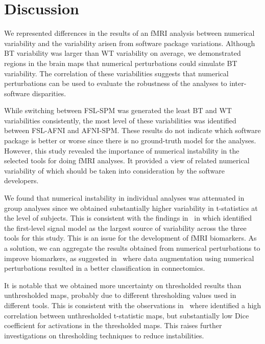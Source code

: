   \section{Discussion}

  We represented differences in the results of an fMRI analysis between numerical variability
  and the variability arisen from software package variations.
  Although BT variability was larger than WT variability on average,
  we demonstrated regions in the brain maps that numerical perturbations could simulate BT variability.
  The correlation of these variabilities suggests that numerical perturbations can be used to evaluate the robustness of the analyses
  to inter-software disparities.
  
  While switching between FSL-SPM was generated the least BT and WT variabilities consistently, the most level of these variabilities was identified
  between FSL-AFNI and AFNI-SPM. %
  These results do not indicate which software package is better or worse since there is no ground-truth model for the analyses.
  However, this study revealed the importance of numerical instability in the selected tools for doing fMRI analyses.
  It provided a view of related numerical variability of which should be taken into consideration by the software developers.
  
  We found that numerical instability in individual analyses was attenuated in group analyses
  since we obtained substantially higher variability in t-statistics at the level of subjects.
  This is consistent with the findings in~\cite{bowring2021isolating} in which identified the first-level signal model as the largest
  source of variability across the three tools for this study.
  This is an issue for the development of fMRI biomarkers.
  As a solution, we can aggregate the results obtained from numerical perturbations to improve biomarkers,
  as suggested in~\cite{kiar2020numerical} where data augmentation using numerical perturbations resulted in a better classification in connectomics.
  
  It is notable that we obtained more uncertainty on thresholded results than unthresholded maps, %
  probably due to different thresholding values used in different tools.
  This is consistent with the observations in~\cite{bowring2021isolating} where identified a high correlation between unthresholded t-statistic maps,
  but substantially low Dice coefficient for activations in the thresholded maps.
  This raises further investigations on thresholding techniques to reduce instabilities.
  
